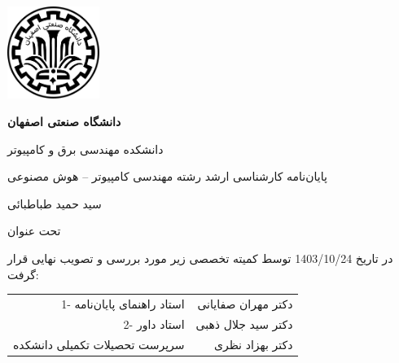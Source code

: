 \thispagestyle{empty}
\begin{center}
	\includegraphics[height=3cm]{iut_logo.png}
	\vspace{0.4cm}
	
	\textbf{دانشگاه صنعتی اصفهان}\\
	\vspace{0.4cm}
	
	{\large
		دانشکده مهندسی برق و کامپیوتر
	}
	\vspace{1.8cm}
	
	\vfill
	
	{\Large
		پایان‌نامه کارشناسی ارشد رشته مهندسی کامپیوتر -- هوش مصنوعی 
		
				\vspace{0.7cm}
		سید حمید طباطبائی\\
	}
	
	\vfill
	\vspace{1.5cm}
	
	{\normalsize
		تحت عنوان\\
	}
	
	\vspace{0.5cm}
	{\large
	}
\end{center}


\vspace*{4cm}

در تاریخ 1403/10/24 توسط کمیته تخصصی زیر مورد بررسی و تصویب نهایی قرار گرفت:\\
\vspace{0.8cm}

{\normalsize
	
	\begin{tabular}{rr}
		\vspace*{.8cm}
		1- استاد راهنمای پایان‌نامه  & \hspace{2cm} دکتر مهران صفایانی\\
		\vspace{.8cm}
		2- استاد داور &\hspace{2cm} دکتر سید جلال ذهبی\\
		\vspace{.8cm}
		سرپرست تحصیلات تکمیلی دانشکده &\hspace{2cm} دکتر بهزاد نظری\\
	\end{tabular}
}
\restoregeometry
\pagebreak


